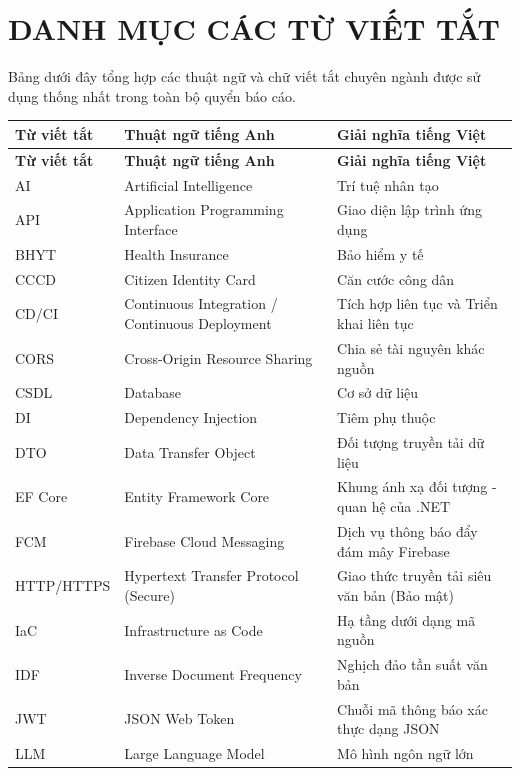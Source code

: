 \chapter*{DANH MỤC CÁC TỪ VIẾT TẮT}

Bảng dưới đây tổng hợp các thuật ngữ và chữ viết tắt chuyên ngành được sử dụng thống nhất trong toàn bộ quyển báo cáo.

\begin{longtable}{|p{3.2cm}|p{5.8cm}|p{5.5cm}|}
\hline
\textbf{Từ viết tắt} & \textbf{Thuật ngữ tiếng Anh} & \textbf{Giải nghĩa tiếng Việt} \\
\hline
\endfirsthead
\hline
\textbf{Từ viết tắt} & \textbf{Thuật ngữ tiếng Anh} & \textbf{Giải nghĩa tiếng Việt} \\
\hline
\endhead
AI & Artificial Intelligence & Trí tuệ nhân tạo \\
\hline
API & Application Programming Interface & Giao diện lập trình ứng dụng \\
\hline
BHYT & Health Insurance & Bảo hiểm y tế \\
\hline
CCCD & Citizen Identity Card & Căn cước công dân \\
\hline
CD/CI & Continuous Integration / Continuous Deployment & Tích hợp liên tục và Triển khai liên tục \\
\hline
CORS & Cross-Origin Resource Sharing & Chia sẻ tài nguyên khác nguồn \\
\hline
CSDL & Database & Cơ sở dữ liệu \\
\hline
DI & Dependency Injection & Tiêm phụ thuộc \\
\hline
DTO & Data Transfer Object & Đối tượng truyền tải dữ liệu \\
\hline
EF Core & Entity Framework Core & Khung ánh xạ đối tượng - quan hệ của .NET \\
\hline
FCM & Firebase Cloud Messaging & Dịch vụ thông báo đẩy đám mây Firebase \\
\hline
HTTP/HTTPS & Hypertext Transfer Protocol (Secure) & Giao thức truyền tải siêu văn bản (Bảo mật) \\
\hline
IaC & Infrastructure as Code & Hạ tầng dưới dạng mã nguồn \\
\hline
IDF & Inverse Document Frequency & Nghịch đảo tần suất văn bản \\
\hline
JWT & JSON Web Token & Chuỗi mã thông báo xác thực dạng JSON \\
\hline
LLM & Large Language Model & Mô hình ngôn ngữ lớn \\

\end{longtable}
